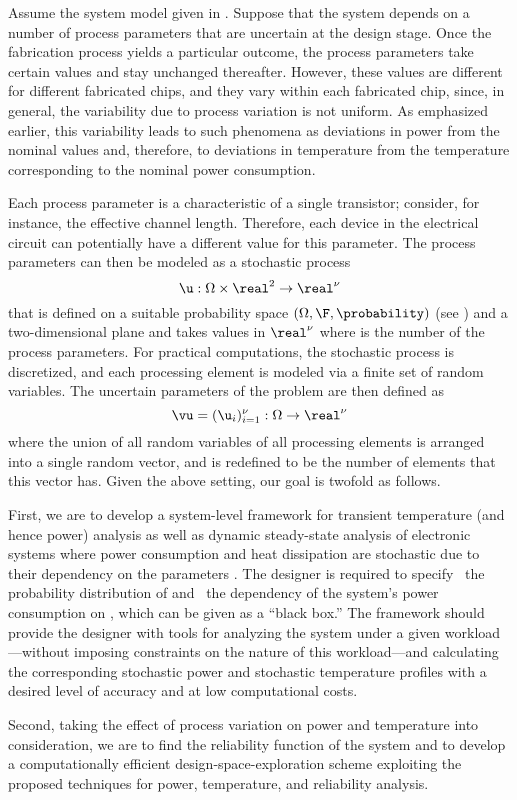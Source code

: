 Assume the system model given in . Suppose that the system
depends on a number of process parameters that are uncertain at the design
stage. Once the fabrication process yields a particular outcome, the process
parameters take certain values and stay unchanged thereafter. However, these
values are different for different fabricated chips, and they vary within each
fabricated chip, since, in general, the variability due to process variation is
not uniform. As emphasized earlier, this variability leads to such phenomena as
deviations in power from the nominal values and, therefore, to deviations in
temperature from the temperature corresponding to the nominal power consumption.

Each process parameter is a characteristic of a single transistor; consider, for
instance, the effective channel length. Therefore, each device in the electrical
circuit can potentially have a different value for this parameter. The process
parameters can then be modeled as a stochastic process
\[
  \u: \Omega \times \real^2 \to \real^\nu
\]
that is defined on a suitable probability space $(\Omega, \F, \probability)$
(see ) and a two-dimensional plane and takes values in
$\real^\nu$ where \nu is the number of the process parameters. For practical
computations, the stochastic process is discretized, and each processing element
is modeled via a finite set of random variables. The uncertain parameters of the
problem are then defined as
\[
  \vu = (\u_i)_{i = 1}^\nu: \Omega \to \real^\nu
\]
where the union of all random variables of all processing elements is arranged
into a single random vector, and \nu is redefined to be the number of elements
that this vector has. Given the above setting, our goal is twofold as follows.

First, we are to develop a system-level framework for transient temperature (and
hence power) analysis as well as dynamic steady-state analysis of electronic
systems where power consumption and heat dissipation are stochastic due to their
dependency on the parameters \vu. The designer is required to specify \one~the
probability distribution of \vu and \two~the dependency of the system's power
consumption on \vu, which can be given as a ``black box.'' The framework should
provide the designer with tools for analyzing the system under a given
workload---without imposing constraints on the nature of this workload---and
calculating the corresponding stochastic power \mp and stochastic temperature
\mq profiles with a desired level of accuracy and at low computational costs.

Second, taking the effect of process variation on power and temperature into
consideration, we are to find the reliability function of the system and to
develop a computationally efficient design-space-exploration scheme exploiting
the proposed techniques for power, temperature, and reliability analysis.
